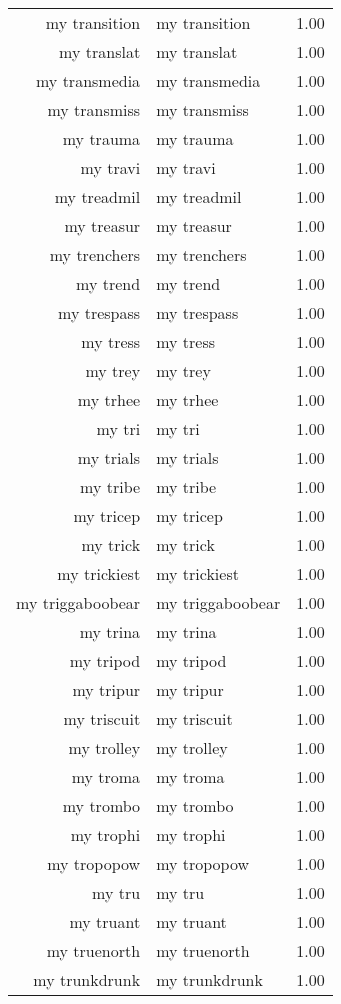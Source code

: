 \begin{table}[ht]
\begin{tabular}{rlr}
  my transition & my transition & 1.00 \\ 
  my translat & my translat & 1.00 \\ 
  my transmedia & my transmedia & 1.00 \\ 
  my transmiss & my transmiss & 1.00 \\ 
  my trauma & my trauma & 1.00 \\ 
  my travi & my travi & 1.00 \\ 
  my treadmil & my treadmil & 1.00 \\ 
  my treasur & my treasur & 1.00 \\ 
  my trenchers & my trenchers & 1.00 \\ 
  my trend & my trend & 1.00 \\ 
  my trespass & my trespass & 1.00 \\ 
  my tress & my tress & 1.00 \\ 
  my trey & my trey & 1.00 \\ 
  my trhee & my trhee & 1.00 \\ 
  my tri & my tri & 1.00 \\ 
  my trials & my trials & 1.00 \\ 
  my tribe & my tribe & 1.00 \\ 
  my tricep & my tricep & 1.00 \\ 
  my trick & my trick & 1.00 \\ 
  my trickiest & my trickiest & 1.00 \\ 
  my triggaboobear & my triggaboobear & 1.00 \\ 
  my trina & my trina & 1.00 \\ 
  my tripod & my tripod & 1.00 \\ 
  my tripur & my tripur & 1.00 \\ 
  my triscuit & my triscuit & 1.00 \\ 
  my trolley & my trolley & 1.00 \\ 
  my troma & my troma & 1.00 \\ 
  my trombo & my trombo & 1.00 \\ 
  my trophi & my trophi & 1.00 \\ 
  my tropopow & my tropopow & 1.00 \\ 
  my tru & my tru & 1.00 \\ 
  my truant & my truant & 1.00 \\ 
  my truenorth & my truenorth & 1.00 \\ 
  my trunkdrunk & my trunkdrunk & 1.00 \\ 

\end{tabular}
\end{table}
